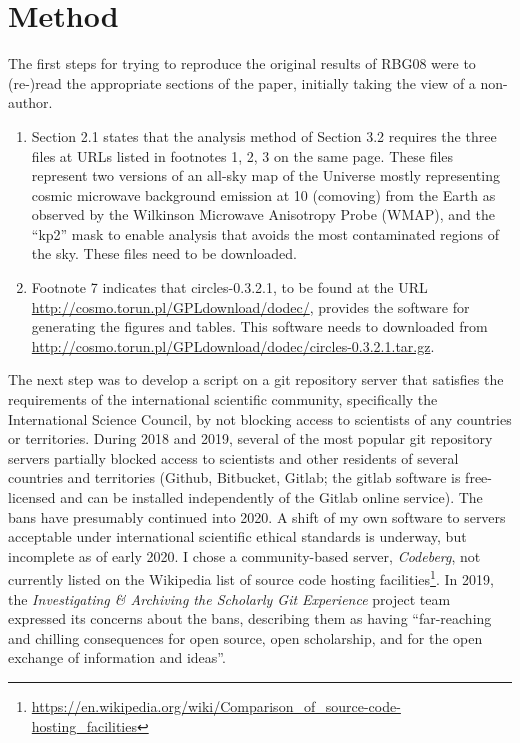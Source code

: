 \section{Method}

The first steps for trying to reproduce the original results
of RBG08 were to (re-)read the appropriate sections of the paper,
initially taking the view of a non-author.
\begin{enumerate}
\item
  Section 2.1\supercite{RBG08} states that the analysis method of
  Section 3.2 requires the three files at URLs listed in footnotes 1,
  2, 3 on the same page. These files represent two versions of an
  all-sky map of the Universe mostly representing cosmic microwave
  background emission at 10{\hGpc} (comoving) from the Earth as
  observed by the Wilkinson Microwave Anisotropy Probe
  (WMAP)\supercite{WMAP5Hinshaw}, and the ``kp2'' mask to enable
  analysis that avoids the most contaminated regions of the sky. These
  files need to be downloaded.
\item
  Footnote 7\supercite{RBG08} indicates that {\sc circles-0.3.2.1}, to
  be found at the URL \url{http://cosmo.torun.pl/GPLdownload/dodec/},
  provides the software for generating the figures and tables. This
  software needs to downloaded from
  \url{http://cosmo.torun.pl/GPLdownload/dodec/circles-0.3.2.1.tar.gz}.
\end{enumerate}

The next step was to develop a script on a {\sc git} repository server
that satisfies the requirements of the international scientific
community, specifically the International Science
Council\supercite{ISCFreedoms}, by not blocking access to scientists
of any countries or territories.  During 2018 and 2019, several of the
most popular {\sc git} repository servers partially blocked access to scientists
and other residents of several countries and territories
(Github\supercite{Github2020ToS,TechCrunch2019github,Zdnet2019github},
Bitbucket\supercite{Atlassian2019bitbucket},
Gitlab\supercite{Gitlab2018ban}; the {\sc gitlab} software is free-licensed
and can be installed independently of the Gitlab online service).
The bans have presumably continued into 2020.
A shift of my own software to servers acceptable under international
scientific ethical standards is underway, but incomplete as of early
2020. I chose a community-based server, {\em Codeberg}, not currently listed
on the Wikipedia list of source code hosting
facilities\footnote{\url{https://en.wikipedia.org/wiki/Comparison_of_source-code-hosting_facilities}}.
In 2019, the {\em Investigating \& Archiving the Scholarly Git Experience} project team
expressed its concerns about the bans, describing them as having ``far-reaching and chilling consequences
for open source, open scholarship, and for the open exchange of information and ideas''\supercite{IASGE2019}.

